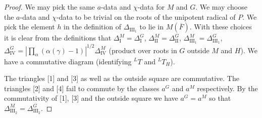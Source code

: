 \documentclass{amsart}
\begin{document}
\begin{proof}  We may pick the same $a$-data
and $\chi$-data for $M$ and $G$. We may choose
the $a$-data and $\chi$-data to be trivial on the
roots of the unipotent radical of $P$. We pick the element $h$ in the definition
of ${\Delta_{\text{III}_1}}$ to lie in $M(\overline F)$.
With these choices it is clear from the 
definitions that
$\Delta_{\text{I}}^M=\Delta_{\text{I}}^G$,
$\Delta_{\text{II}}^M=\Delta_{\text{II}}^G$,
$\Delta_{\text{III}_1}^M=\Delta_{\text{III}_1}^G$,
$\Delta_{\text{IV}}^G=
|\prod_\alpha(\alpha(\gamma)-1)|^{1/2}\Delta_{\text{IV}}^M$
(product over roots in $G$ outside $M$ and $H$).
We have a commutative diagram (identifying 
${}^LT$ and ${}^LT_H$).\par
\bigskip





\begin{figure}[htb]
\centering
{}
\end{figure}


\noindent The triangles [1] and [3] as well as the outside square 
are commutative.
The triangles [2] and [4] fail to commute by the 
classes $a^G$ and $a^M$ respectively.  By the 
commutativity of [1], [3] and the outside square we have 
$a^G = a^M$ so that
$\Delta_{\text{III}_2}^M =\Delta_{\text{III}_2}^G$.
\end{proof}
\end{document}

